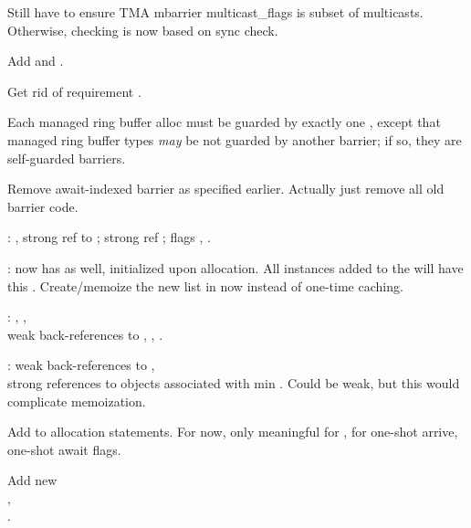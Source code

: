 
Still have to ensure TMA mbarrier multicast\_flags is subset of multicasts.
Otherwise, checking is now based on sync check.

Add  and .

\newpage
{}

Get rid of  requirement .

Each managed ring buffer alloc  must be guarded by exactly one , except that managed ring buffer  types \textit{may} be not guarded by another barrier; if so, they are self-guarded barriers.

Remove await-indexed barrier as specified earlier.
Actually just remove all old barrier code.

: , strong ref to ; strong ref ; flags , .

: now has  as well, initialized upon allocation.
All  instances added to the  will have this .
Create/memoize the new  list in  now instead of one-time caching.

: , ,\\
weak back-references to , , .

: weak back-references to ,\\
strong references to  objects associated with min .
Could be weak, but this would complicate memoization.


Add  to allocation statements.
For now, only meaningful for , for one-shot arrive, one-shot await flags.

Add new\\
,\\ .


